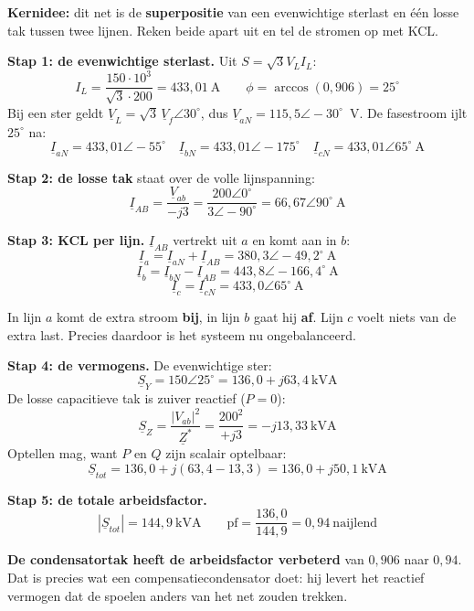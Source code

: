 \documentclass[a4paper,11pt]{article}
\begin{document}
\begin{oefenblok}

    \begin{examenbox}
        \textbf{Kernidee:} dit net is de \textbf{superpositie} van een evenwichtige sterlast en één
        losse tak tussen twee lijnen. Reken beide apart uit en tel de stromen op met KCL.
    \end{examenbox}

    \textbf{Stap 1: de evenwichtige sterlast.} Uit $S = \sqrt{3}V_L I_L$:
    \[I_L = \frac{150 \cdot 10^3}{\sqrt{3} \cdot 200} = 433{,}01\ \text{A}
        \qquad \phi = \arccos(0{,}906) = 25^\circ\]
    Bij een ster geldt $\underline{V}_L = \sqrt{3}\,\underline{V}_f\angle 30^\circ$, dus
    $\underline{V}_{aN} = 115{,}5\angle -30^\circ$~V. De fasestroom ijlt $25^\circ$ na:
    \[\underline{I}_{aN} = 433{,}01\angle -55^\circ \quad
        \underline{I}_{bN} = 433{,}01\angle -175^\circ \quad
        \underline{I}_{cN} = 433{,}01\angle 65^\circ\ \text{A}\]

    \textbf{Stap 2: de losse tak} staat over de volle lijnspanning:
    \[\underline{I}_{AB} = \frac{\underline{V}_{ab}}{-j3} = \frac{200\angle 0^\circ}{3\angle -90^\circ} = 66{,}67\angle 90^\circ\ \text{A}\]

    \textbf{Stap 3: KCL per lijn.} $\underline{I}_{AB}$ vertrekt uit $a$ en komt aan in $b$:
    \[\underline{I}_a = \underline{I}_{aN} + \underline{I}_{AB} = \boxed{380{,}3\angle -49{,}2^\circ\ \text{A}}\]
    \[\underline{I}_b = \underline{I}_{bN} - \underline{I}_{AB} = \boxed{443{,}8\angle -166{,}4^\circ\ \text{A}}\]
    \[\underline{I}_c = \underline{I}_{cN} = \boxed{433{,}0\angle 65^\circ\ \text{A}}\]

    \begin{waarschuwing}
        In lijn $a$ komt de extra stroom \textbf{bij}, in lijn $b$ gaat hij \textbf{af}. Lijn $c$
        voelt niets van de extra last. Precies daardoor is het systeem nu ongebalanceerd.
    \end{waarschuwing}

    \textbf{Stap 4: de vermogens.} De evenwichtige ster:
    \[\underline{S}_Y = 150\angle 25^\circ = 136{,}0 + j63{,}4\ \text{kVA}\]
    De losse capacitieve tak is zuiver reactief ($P = 0$):
    \[\underline{S}_Z = \frac{|V_{ab}|^2}{\underline{Z}^{*}} = \frac{200^2}{+j3} = -j13{,}33\ \text{kVA}\]
    Optellen mag, want $P$ en $Q$ zijn scalair optelbaar:
    \[\underline{S}_{tot} = 136{,}0 + j(63{,}4 - 13{,}3) = \boxed{136{,}0 + j50{,}1\ \text{kVA}}\]

    \textbf{Stap 5: de totale arbeidsfactor.}
    \[|\underline{S}_{tot}| = 144{,}9\ \text{kVA} \qquad
        \text{pf} = \frac{136{,}0}{144{,}9} = \boxed{0{,}94\ \text{naijlend}}\]

    \textbf{De condensatortak heeft de arbeidsfactor verbeterd} van $0{,}906$ naar $0{,}94$. Dat is
    precies wat een compensatiecondensator doet: hij levert het reactief vermogen dat de spoelen
    anders van het net zouden trekken.
\end{oefenblok}
\end{document}
